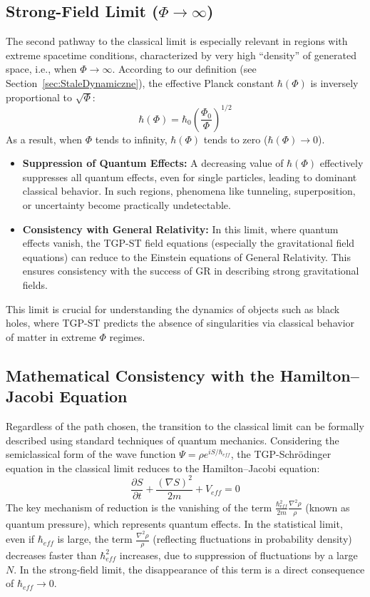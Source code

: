 \documentclass[11pt,a4paper]{article}
\begin{document}
\subsection{Strong-Field Limit ($\Phi \rightarrow \infty$)}
The second pathway to the classical limit is especially relevant in regions with extreme spacetime conditions, characterized by very high “density” of generated space, i.e., when $\Phi \rightarrow \infty$. According to our definition (see Section~\ref{sec:StaleDynamiczne}), the effective Planck constant $\hbar(\Phi)$ is inversely proportional to $\sqrt{\Phi}$:
\begin{equation}
    \hbar(\Phi) = \hbar_0 \left(\frac{\Phi_0}{\Phi}\right)^{1/2}
\end{equation}
As a result, when $\Phi$ tends to infinity, $\hbar(\Phi)$ tends to zero ($\hbar(\Phi) \rightarrow 0$).
\begin{itemize}
    \item \textbf{Suppression of Quantum Effects:} A decreasing value of $\hbar(\Phi)$ effectively suppresses all quantum effects, even for single particles, leading to dominant classical behavior. In such regions, phenomena like tunneling, superposition, or uncertainty become practically undetectable.
    \item \textbf{Consistency with General Relativity:} In this limit, where quantum effects vanish, the TGP-ST field equations (especially the gravitational field equations) can reduce to the Einstein equations of General Relativity. This ensures consistency with the success of GR in describing strong gravitational fields.
\end{itemize}
This limit is crucial for understanding the dynamics of objects such as black holes, where TGP-ST predicts the absence of singularities via classical behavior of matter in extreme $\Phi$ regimes.

\subsection{Mathematical Consistency with the Hamilton–Jacobi Equation}
Regardless of the path chosen, the transition to the classical limit can be formally described using standard techniques of quantum mechanics. Considering the semiclassical form of the wave function $\Psi = \rho e^{iS/\hbar_{eff}}$, the TGP-Schrödinger equation in the classical limit reduces to the Hamilton–Jacobi equation:
\begin{equation}
    \frac{\partial S}{\partial t} + \frac{(\nabla S)^2}{2m} + V_{eff} = 0
\end{equation}
The key mechanism of reduction is the vanishing of the term $\frac{\hbar_{eff}^2}{2m}\frac{\nabla^2\rho}{\rho}$ (known as quantum pressure), which represents quantum effects. In the statistical limit, even if $\hbar_{eff}$ is large, the term $\frac{\nabla^2\rho}{\rho}$ (reflecting fluctuations in probability density) decreases faster than $\hbar_{eff}^2$ increases, due to suppression of fluctuations by a large $N$. In the strong-field limit, the disappearance of this term is a direct consequence of $\hbar_{eff} \rightarrow 0$.
\end{document}
